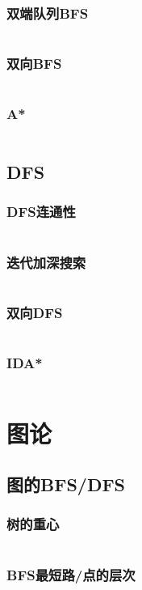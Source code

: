 \documentclass[a4paper,12pt]{article}
\begin{document}
\subsubsection{双端队列BFS}
\inputminted[breaklines]{c++}{search/bfs/deq_bfs.cc}
\subsubsection{双向BFS}
\inputminted[breaklines]{c++}{search/bfs/2side_bfs.cc}
\subsubsection{A*}
\inputminted[breaklines]{c++}{search/bfs/astar.cc}
\subsection{DFS}
\subsubsection{DFS连通性}
\inputminted[breaklines]{c++}{search/dfs/link.cc}
\subsubsection{迭代加深搜索}
\inputminted[breaklines]{c++}{search/dfs/diedai.cc}
\subsubsection{双向DFS}
\inputminted[breaklines]{c++}{search/dfs/2side.cc}
\subsubsection{IDA*}
\inputminted[breaklines]{c++}{search/dfs/ida.cc}


\newpage
\section{图论} %
\subsection{图的BFS/DFS}  %
\subsubsection{树的重心}
\inputminted[breaklines]{c++}{graph/bdfs/grav.cc}
\subsubsection{BFS最短路/点的层次}
\inputminted[breaklines]{c++}{graph/bdfs/cenci.cc}
\end{document}
